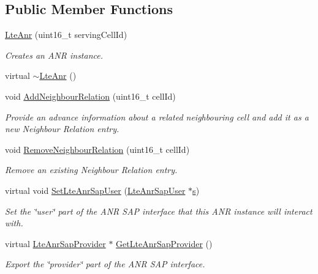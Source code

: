\subsection*{Public Member Functions}
\begin{DoxyCompactItemize}
\item 
\hyperlink{classns3_1_1LteAnr_a87156ea4712fa102a094626a93a1c70b}{Lte\+Anr} (uint16\+\_\+t serving\+Cell\+Id)
\begin{DoxyCompactList}\small\item\em Creates an A\+NR instance. \end{DoxyCompactList}\item 
virtual \hyperlink{classns3_1_1LteAnr_ac460bc19a764741725eb1d3ddd61ec62}{$\sim$\+Lte\+Anr} ()
\item 
void \hyperlink{classns3_1_1LteAnr_a989f8f704d368cf850555f7a425c800d}{Add\+Neighbour\+Relation} (uint16\+\_\+t cell\+Id)
\begin{DoxyCompactList}\small\item\em Provide an advance information about a related neighbouring cell and add it as a new Neighbour Relation entry. \end{DoxyCompactList}\item 
void \hyperlink{classns3_1_1LteAnr_a6c9214f71ded72cea62e20d24f2dd62a}{Remove\+Neighbour\+Relation} (uint16\+\_\+t cell\+Id)
\begin{DoxyCompactList}\small\item\em Remove an existing Neighbour Relation entry. \end{DoxyCompactList}\item 
virtual void \hyperlink{classns3_1_1LteAnr_ad39591ffe1017103df3105ba75cfe4af}{Set\+Lte\+Anr\+Sap\+User} (\hyperlink{classns3_1_1LteAnrSapUser}{Lte\+Anr\+Sap\+User} $\ast$\hyperlink{generate__test__data__lte__sinr_8m_ad83eeb3a142285d1243a08c6b7026df8}{s})
\begin{DoxyCompactList}\small\item\em Set the \char`\"{}user\char`\"{} part of the A\+NR S\+AP interface that this A\+NR instance will interact with. \end{DoxyCompactList}\item 
virtual \hyperlink{classns3_1_1LteAnrSapProvider}{Lte\+Anr\+Sap\+Provider} $\ast$ \hyperlink{classns3_1_1LteAnr_a3603512c5cd9c7fd17e87cdf6cbbd7b4}{Get\+Lte\+Anr\+Sap\+Provider} ()
\begin{DoxyCompactList}\small\item\em Export the \char`\"{}provider\char`\"{} part of the A\+NR S\+AP interface. \end{DoxyCompactList}\end{DoxyCompactItemize}
